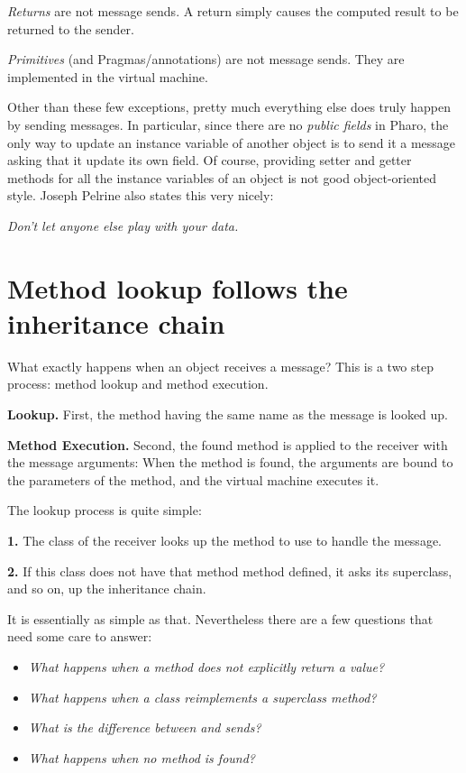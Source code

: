 \documentclass[10pt,twoside,english]{_support/latex/sbabook/sbabook}
\begin{document}
\textit{Returns} are not message sends. A return simply causes the computed result to
be returned to the sender.

\textit{Primitives} (and Pragmas/annotations) are not message sends. They are
implemented in the virtual machine.

Other than these few exceptions, pretty much everything else does truly happen
by sending messages. In particular, since there are no \textit{public fields} in
Pharo, the only way to update an instance variable of another object is to send
it a message asking that it update its own field. Of course, providing setter
and getter methods for all the instance variables of an object is not good
object-oriented style. Joseph Pelrine also states this very nicely:

\textit{Don't let anyone else play with your data.}
\chapter{Method lookup follows the inheritance chain}
What exactly happens when an object receives a message?
This is a two step process: method lookup and method execution.

\textbf{Lookup.} First, the method having the same name as the message is looked up.

\textbf{Method Execution.} Second, the found method is applied to the receiver with
the message arguments: When the method is found, the arguments are bound to the
parameters of the method, and the virtual machine executes it.

The lookup process is quite simple:

\textbf{1.} The class of the receiver looks up the method to use to handle the
message.

\textbf{2.} If this class does not have that method method defined, it asks its
superclass, and so on, up the inheritance chain.

It is essentially as simple as that. Nevertheless there are a few questions that
need some care to answer:

\begin{itemize}
\item \textit{What happens when a method does not explicitly return a value?}
\item \textit{What happens when a class reimplements a superclass method?}
\item \textit{What is the difference between  and  sends?}
\item \textit{What happens when no method is found?}
\end{itemize}
\end{document}
